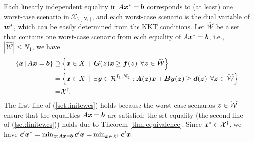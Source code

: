 \documentclass[fleqn,mnsc,blindrev]{informs4}
\newcommand{\mb}[1]{\mbox{\boldmath \ensuremath{#1}}}
\begin{document}
\begin{appendices}
{	Each linearly independent equality in $A\mb{x}^* = \mb{b}$ corresponds to (at least) one worst-case scenario in $\mathcal{X}_{\setminus [N_2]}$, and each worst-case scenario is the dual variable of $\mb{w}^*$, which can be easily determined from the KKT conditions. Let $\widehat{\mathcal{W}}$ be a set that contains one worst-case scenario from each equality of $A\mb{x}^* = \mb{b}$, i.e., $|\widehat{\mathcal{W}}| \le N_1$, we have
\begin{equation} \label{set:finitewcs}
	\begin{aligned}
	\left\{ \mb{x} \, | \,  A\mb{x} = \mb{b} \right\}   \supseteq& \left\{ \mb{x} \in X  \enskip | \enskip  \boldsymbol{G}(\boldsymbol{z}) \boldsymbol{x}  \ge \boldsymbol{f} (\boldsymbol{z}) \enskip \forall \boldsymbol{z} \in  \widehat{\mathcal{W}} \right\}\\
	=&  \left\{ \mb{x} \in X  \enskip |  \enskip \exists \mb{y} \in \mathcal{R}^{I_1,N_2}: \mb{A}(\mb{z}) \mb{x}+\mb{B}\mb{y}(\mb{z}) \geq\mb{d}(\mb{z})  \enskip \forall \mb{z} \in  \widehat{\mathcal{W}} \right\}\\
	=&  \mathcal{X}^{\dagger}.
	\end{aligned}
\end{equation}
	The first line of (\ref{set:finitewcs}) holds because the worst-case scenarios $\mb{z} \in \widehat{\mathcal{W}}$ ensure that the equalities $A\mb{x} = \mb{b}$ are satisfied; the set equality (the second line of (\ref{set:finitewcs})) holds due to Theorem \ref{thm:equivalence}. Since  $\mb{x}^* \in \mathcal{X}^{\dagger}$, we have
	$
	\mb{c}'\mb{x}^* = \min_{\boldsymbol{x} : A \boldsymbol{x} = \boldsymbol{b}} \mb{c}'\mb{x} = \min_{\boldsymbol{x} \in \mathcal{X}^{\dagger}} \mb{c}'\mb{x}.
	$ \hfill \Halmos
\fi

}\newpage
	

\end{appendices}
\end{document}
